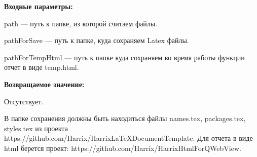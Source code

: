 \textbf{Входные параметры:}

path --- путь к папке, из которой считаем файлы.
 
    pathForSave --- путь к папке, куда сохраняем Latex файлы.
 
    pathForTempHtml --- путь к папке куда сохраняем во время работы функции отчет в виде temp.html.

\textbf{Возвращаемое значение:}

Отсутствует.

В папке сохранения должны быть находиться файлы names.tex, packages.tex, styles.tex из проекта https://github.com/Harrix/HarrixLaTeXDocumentTemplate. Для отчета в виде html берется проект: https://github.com/Harrix/HarrixHtmlForQWebView.
